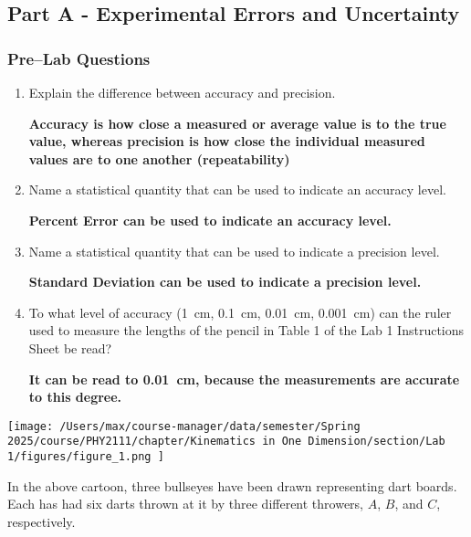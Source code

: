 
\subsection{Part A - Experimental Errors and Uncertainty}

\subsubsection{Pre--Lab Questions}

\begin{enumerate}
	\item Explain the difference between accuracy and precision.

	      \textbf{Accuracy is how close a measured or average value is to the true value, whereas precision is how close the individual measured values are to one another (repeatability)}

	\item Name a statistical quantity that can be used to indicate an accuracy level.

	      \textbf{Percent Error can be used to indicate an accuracy level.}

	\item Name a statistical quantity that can be used to indicate a precision level.

	      \textbf{Standard Deviation can be used to indicate a precision level.}

	\item To what level of accuracy (\SI{1}{cm}, \SI{0.1}{cm}, \SI{0.01}{cm}, \SI{0.001}{cm}) can the ruler used to measure the lengths of the pencil in Table 1 of the Lab 1 Instructions Sheet be read?

	      \textbf{It can be read to \SI{0.01}{cm}, because the measurements are accurate to this degree.}
\end{enumerate}

\newpage

\begin{center}
	\texttt{[image: /Users/max/course-manager/data/semester/Spring 2025/course/PHY2111/chapter/Kinematics in One Dimension/section/Lab 1/figures/figure\_1.png
	]}
\end{center}

In the above cartoon, three bullseyes have been drawn representing dart boards. Each has had six darts thrown at it by three different throwers, $A$, $B$, and $C$, respectively.

